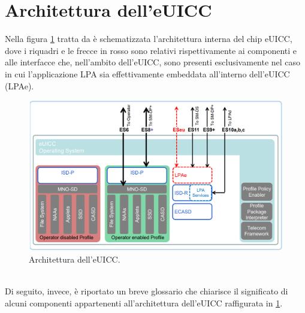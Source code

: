 \documentclass[10pt, oneside]{book}
\begin{document}
\section{Architettura dell'eUICC}
Nella figura \ref{fig:eUICC-arch} tratta da \cite{GSMA-docs-new} è schematizzata l'architettura interna del chip eUICC, dove i riquadri e le frecce in rosso sono relativi rispettivamente ai componenti e alle interfacce che, nell'ambito dell'eUICC, sono presenti esclusivamente nel caso in cui l'applicazione LPA sia effettivamente embeddata all'interno dell'eUICC (LPAe).
\begin{figure}
\includegraphics[width=\linewidth]{eUICC-arch.png}
\caption{Architettura dell'eUICC.}
\label{fig:eUICC-arch}
\end{figure}
\\Di seguito, invece, è riportato un breve glossario che chiarisce il significato di alcuni componenti appartenenti all'architettura dell'eUICC raffigurata in \ref{fig:eUICC-arch}.
\end{document}
